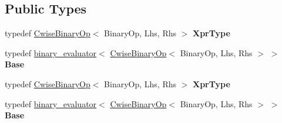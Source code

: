 \subsection*{Public Types}
\begin{DoxyCompactItemize}
\item 
\mbox{\label{struct_eigen_1_1internal_1_1evaluator_3_01_cwise_binary_op_3_01_binary_op_00_01_lhs_00_01_rhs_01_4_01_4_a9aa325937ac24cbe1018888545945b7c}} 
typedef \hyperlink{group___core___module_class_eigen_1_1_cwise_binary_op}{Cwise\+Binary\+Op}$<$ Binary\+Op, Lhs, Rhs $>$ {\bfseries Xpr\+Type}
\item 
\mbox{\label{struct_eigen_1_1internal_1_1evaluator_3_01_cwise_binary_op_3_01_binary_op_00_01_lhs_00_01_rhs_01_4_01_4_a24ab7370ad4617d9918b64f2dd46d27e}} 
typedef \hyperlink{struct_eigen_1_1internal_1_1binary__evaluator}{binary\+\_\+evaluator}$<$ \hyperlink{group___core___module_class_eigen_1_1_cwise_binary_op}{Cwise\+Binary\+Op}$<$ Binary\+Op, Lhs, Rhs $>$ $>$ {\bfseries Base}
\item 
\mbox{\label{struct_eigen_1_1internal_1_1evaluator_3_01_cwise_binary_op_3_01_binary_op_00_01_lhs_00_01_rhs_01_4_01_4_a9aa325937ac24cbe1018888545945b7c}} 
typedef \hyperlink{group___core___module_class_eigen_1_1_cwise_binary_op}{Cwise\+Binary\+Op}$<$ Binary\+Op, Lhs, Rhs $>$ {\bfseries Xpr\+Type}
\item 
\mbox{\label{struct_eigen_1_1internal_1_1evaluator_3_01_cwise_binary_op_3_01_binary_op_00_01_lhs_00_01_rhs_01_4_01_4_a24ab7370ad4617d9918b64f2dd46d27e}} 
typedef \hyperlink{struct_eigen_1_1internal_1_1binary__evaluator}{binary\+\_\+evaluator}$<$ \hyperlink{group___core___module_class_eigen_1_1_cwise_binary_op}{Cwise\+Binary\+Op}$<$ Binary\+Op, Lhs, Rhs $>$ $>$ {\bfseries Base}
\end{DoxyCompactItemize}
